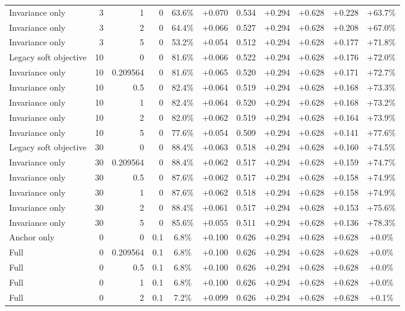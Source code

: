 \begin{table}[htbp]
\begin{tabular}{lrrrccccccc}
Invariance only & 3 & 1 & 0 & 63.6\% & +0.070 & 0.534 & +0.294 & +0.628 & +0.228 & +63.7\% \\
Invariance only & 3 & 2 & 0 & 64.4\% & +0.066 & 0.527 & +0.294 & +0.628 & +0.208 & +67.0\% \\
Invariance only & 3 & 5 & 0 & 53.2\% & +0.054 & 0.512 & +0.294 & +0.628 & +0.177 & +71.8\% \\
Legacy soft objective & 10 & 0 & 0 & 81.6\% & +0.066 & 0.522 & +0.294 & +0.628 & +0.176 & +72.0\% \\
Invariance only & 10 & 0.209564 & 0 & 81.6\% & +0.065 & 0.520 & +0.294 & +0.628 & +0.171 & +72.7\% \\
Invariance only & 10 & 0.5 & 0 & 82.4\% & +0.064 & 0.519 & +0.294 & +0.628 & +0.168 & +73.3\% \\
Invariance only & 10 & 1 & 0 & 82.4\% & +0.064 & 0.520 & +0.294 & +0.628 & +0.168 & +73.2\% \\
Invariance only & 10 & 2 & 0 & 82.0\% & +0.062 & 0.519 & +0.294 & +0.628 & +0.164 & +73.9\% \\
Invariance only & 10 & 5 & 0 & 77.6\% & +0.054 & 0.509 & +0.294 & +0.628 & +0.141 & +77.6\% \\
Legacy soft objective & 30 & 0 & 0 & 88.4\% & +0.063 & 0.518 & +0.294 & +0.628 & +0.160 & +74.5\% \\
Invariance only & 30 & 0.209564 & 0 & 88.4\% & +0.062 & 0.517 & +0.294 & +0.628 & +0.159 & +74.7\% \\
Invariance only & 30 & 0.5 & 0 & 87.6\% & +0.062 & 0.517 & +0.294 & +0.628 & +0.158 & +74.9\% \\
Invariance only & 30 & 1 & 0 & 87.6\% & +0.062 & 0.518 & +0.294 & +0.628 & +0.158 & +74.9\% \\
Invariance only & 30 & 2 & 0 & 88.4\% & +0.061 & 0.517 & +0.294 & +0.628 & +0.153 & +75.6\% \\
Invariance only & 30 & 5 & 0 & 85.6\% & +0.055 & 0.511 & +0.294 & +0.628 & +0.136 & +78.3\% \\
Anchor only & 0 & 0 & 0.1 & 6.8\% & +0.100 & 0.626 & +0.294 & +0.628 & +0.628 & +0.0\% \\
Full & 0 & 0.209564 & 0.1 & 6.8\% & +0.100 & 0.626 & +0.294 & +0.628 & +0.628 & +0.0\% \\
Full & 0 & 0.5 & 0.1 & 6.8\% & +0.100 & 0.626 & +0.294 & +0.628 & +0.628 & +0.0\% \\
Full & 0 & 1 & 0.1 & 6.8\% & +0.100 & 0.626 & +0.294 & +0.628 & +0.628 & +0.0\% \\
Full & 0 & 2 & 0.1 & 7.2\% & +0.099 & 0.626 & +0.294 & +0.628 & +0.628 & +0.1\% \\

\end{tabular}
\end{table}
